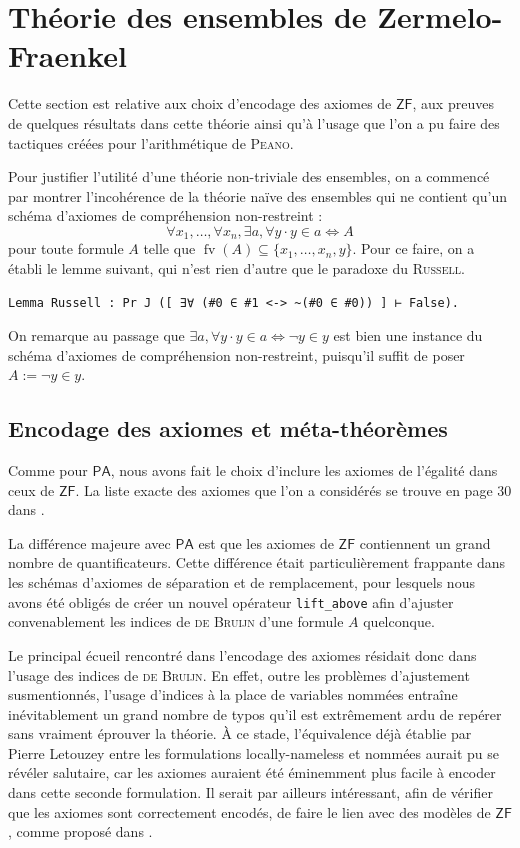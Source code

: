 \documentclass[a4paper]{article}
\DeclareMathOperator{\fv}{\mathrm{fv}}
\newcommand{\PA}{\mathsf{PA}}
\newcommand{\ZF}{\mathsf{ZF}}
\theoremstyle{remark}
\theoremstyle{remark}
\theoremstyle{remark}
\theoremstyle{definition}
\theoremstyle{definition}
\theoremstyle{definition}
\begin{document}

\section{Théorie des ensembles de {\sc Zermelo-Fraenkel}}

Cette section est relative aux choix d'encodage des axiomes de $\ZF$, aux preuves de quelques résultats dans cette théorie ainsi qu'à l'usage que l'on a pu faire des tactiques créées pour l'arithmétique de \textsc{Peano}.

Pour justifier l'utilité d'une théorie non-triviale des ensembles, on a commencé par montrer l'incohérence de la théorie naïve des ensembles qui ne contient qu'un schéma d'axiomes de compréhension non-restreint : \[ \forall x_1, \ldots, \forall x_n, \exists a, \forall y \cdot y \in a \Leftrightarrow A \] pour toute formule $A$ telle que $\fv(A) \subseteq \{ x_1, \ldots, x_n, y \}$. Pour ce faire, on a établi le lemme suivant, qui n'est rien d'autre que le paradoxe du \textsc{Russell}. \begin{verbatim}
Lemma Russell : Pr J ([ ∃∀ (#0 ∈ #1 <-> ~(#0 ∈ #0)) ] ⊢ False).
\end{verbatim}
On remarque au passage que $\exists a, \forall y \cdot y \in a \Leftrightarrow \neg y \in y$ est bien une instance du schéma d'axiomes de compréhension non-restreint, puisqu'il suffit de poser $A := \neg y \in y$.

\subsection{Encodage des axiomes et méta-théorèmes}

Comme pour $\PA$, nous avons fait le choix d'inclure les axiomes de l'égalité dans ceux de $\ZF$. La liste exacte des axiomes que l'on a considérés se trouve en page 30 dans \cite{poly}.

La différence majeure avec $\PA$ est que les axiomes de $\ZF$ contiennent un grand nombre de quantificateurs. Cette différence était particulièrement frappante dans les schémas d'axiomes de séparation et de remplacement, pour lesquels nous avons été obligés de créer un nouvel opérateur \verb+lift_above+ afin d'ajuster convenablement les indices de \textsc{de Bruijn} d'une formule $A$ quelconque.
\smallskip

Le principal écueil rencontré dans l'encodage des axiomes résidait donc dans l'usage des indices de \textsc{de Bruijn}. En effet, outre les problèmes d'ajustement susmentionnés, l'usage d'indices à la place de variables nommées entraîne inévitablement un grand nombre de typos qu'il est extrêmement ardu de repérer sans vraiment éprouver la théorie. \`A ce stade, l'équivalence déjà établie par Pierre Letouzey entre les formulations locally-nameless et nommées aurait pu se révéler salutaire, car les axiomes auraient été éminemment plus facile à encoder dans cette seconde formulation. Il serait par ailleurs intéressant, afin de vérifier que les axiomes sont correctement encodés, de faire le lien avec des modèles de $\ZF$, comme proposé dans \cite{zfmod}.
\end{document}
